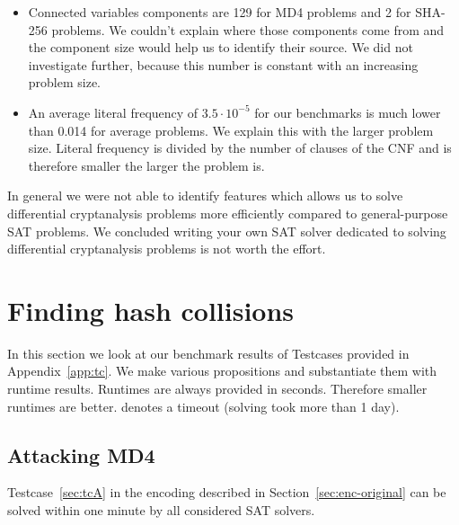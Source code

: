 \begin{itemize}
  \item Connected variables components are 129 for MD4 problems and 2 for SHA-256
    problems. We couldn't explain where those components come from and the
    component size would help us to identify their source. We did not investigate
    further, because this number is constant with an increasing problem size.

  \item An average literal frequency of $3.5\cdot 10^{-5}$ for our benchmarks
    is much lower than 0.014 for average problems. We explain this with the
    larger problem size. Literal frequency is divided by the number of clauses
    of the CNF and is therefore smaller the larger the problem is.
\end{itemize}

In general we were not able to identify features which allows us to solve
differential cryptanalysis problems more efficiently compared to
general-purpose SAT problems. We concluded writing your own SAT solver
dedicated to solving differential cryptanalysis problems is not worth
the effort.

\section{Finding hash collisions}
\label{sec:results-attacks}

In this section we look at our benchmark results of Testcases provided in
Appendix~\ref{app:tc}. We make various propositions and substantiate them
with runtime results. Runtimes are always provided in seconds. Therefore
smaller runtimes are better. \timeout{} denotes a timeout (solving took
more than 1 day).


\subsection{Attacking MD4}
\label{sec:results-md4}
%
\begin{prop}
  Testcase~\ref{sec:tcA} in the encoding described in Section~\ref{sec:enc-original}
  can be solved within one minute by all considered SAT solvers.
\end{prop}

